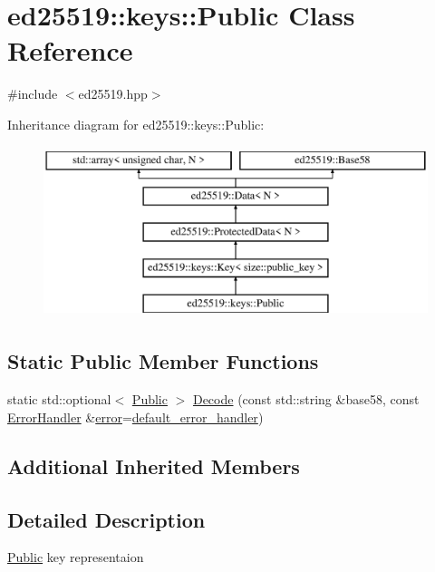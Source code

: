 \hypertarget{classed25519_1_1keys_1_1_public}{}\section{ed25519\+::keys\+::Public Class Reference}
\label{classed25519_1_1keys_1_1_public}


{\ttfamily \#include $<$ed25519.\+hpp$>$}

Inheritance diagram for ed25519\+::keys\+::Public\+:\begin{figure}[H]
\begin{center}
\leavevmode
\includegraphics[height=5.000000cm]{classed25519_1_1keys_1_1_public}
\end{center}
\end{figure}
\subsection*{Static Public Member Functions}
\begin{DoxyCompactItemize}
\item 
static std\+::optional$<$ \mbox{\hyperlink{classed25519_1_1keys_1_1_public}{Public}} $>$ \mbox{\hyperlink{classed25519_1_1keys_1_1_public_af8a468caa9cc98160b65ec072f949e97}{Decode}} (const std\+::string \&base58, const \mbox{\hyperlink{namespaceed25519_a6ba572942b3c18591fc869d52a6b16e6}{Error\+Handler}} \&\mbox{\hyperlink{namespaceed25519_ac93d0b5156eaca22197055e902920bc4}{error}}=\mbox{\hyperlink{namespaceed25519_a7c7bb6ed17541162959c33ed3e3b15fb}{default\+\_\+error\+\_\+handler}})
\end{DoxyCompactItemize}
\subsection*{Additional Inherited Members}


\subsection{Detailed Description}
\mbox{\hyperlink{classed25519_1_1keys_1_1_public}{Public}} key representaion 

